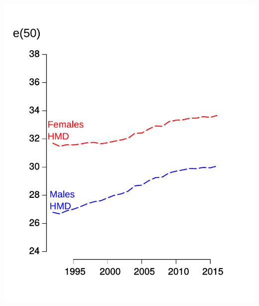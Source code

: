 \documentclass[20pt,usenames,dvipsnames]{beamer}
\begin{document}
\begin{frame}[plain]
\vspace{-1em}
\begin{center}
\includegraphics[height=20cm, keepaspectratio]{Figures/e50_0.pdf}
\end{center}
\end{frame}
\end{document}
